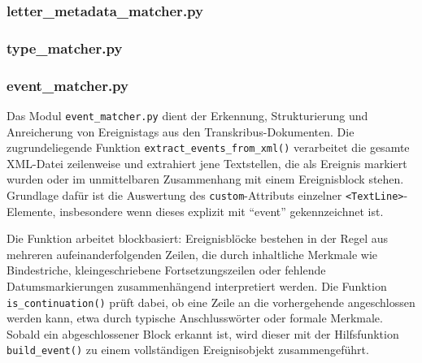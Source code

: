 \documentclass[12pt, a4paper, ngerman, bidi=default]{article}
\begin{document}
\begin{minipage}[t]{0.4\textwidth}
{
}
\label{fig:organization_matcher}
\end{minipage}





\subsubsection{letter\_metadata\_matcher.py}\label{subsection:letter\_metadata\_matcher}

\subsubsection{type\_matcher.py}\label{subsection:type\_matcher}


\subsubsection*{event\_matcher.py}\label{subsection:event\_matcher}

Das Modul \texttt{event\_matcher.py} dient der Erkennung, Strukturierung und Anreicherung von 
Ereignistags aus den Transkribus-Dokumenten. Die zugrundeliegende Funktion \texttt{extract\_events\_from\_xml()} 
verarbeitet die gesamte XML-Datei zeilenweise und extrahiert jene Textstellen, die als Ereignis markiert 
wurden oder im unmittelbaren Zusammenhang mit einem Ereignisblock stehen. Grundlage dafür ist die Auswertung 
des \texttt{custom}-Attributs einzelner \texttt{<TextLine>}-Elemente, insbesondere wenn dieses explizit mit 
\enquote{event} gekennzeichnet ist.

Die Funktion arbeitet blockbasiert: Ereignisblöcke bestehen in der Regel aus mehreren aufeinanderfolgenden 
Zeilen, die durch inhaltliche Merkmale wie Bindestriche, kleingeschriebene Fortsetzungszeilen oder fehlende 
Datumsmarkierungen zusammenhängend interpretiert werden. Die Funktion \texttt{is\_continuation()} prüft dabei, 
ob eine Zeile an die vorhergehende angeschlossen werden kann, etwa durch typische Anschlusswörter oder formale Merkmale. 
Sobald ein abgeschlossener Block erkannt ist, wird dieser mit der Hilfsfunktion \texttt{build\_event()} zu einem 
vollständigen Ereignisobjekt zusammengeführt.
\end{document}
